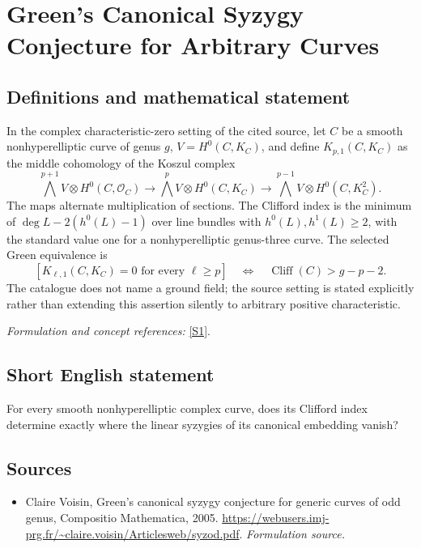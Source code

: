 \documentclass[11pt]{article}
\begin{document}
\section*{\texorpdfstring{Green’s Canonical Syzygy Conjecture for Arbitrary Curves}{Green’s Canonical Syzygy Conjecture for Arbitrary Curves}}\label{30003897}
\subsection{Definitions and mathematical statement}
In the complex characteristic-zero setting of the cited source, let $C$ be a smooth nonhyperelliptic curve of genus $g$, $V=H^0(C,K_C)$, and define $K_{p,1}(C,K_C)$ as the middle cohomology of the Koszul complex
\[
 \bigwedge^{p+1}V\otimes H^0(C,\mathcal O_C)
 \longrightarrow\bigwedge^pV\otimes H^0(C,K_C)
 \longrightarrow\bigwedge^{p-1}V\otimes H^0(C,K_C^2).
\]
The maps alternate multiplication of sections. The Clifford index is the minimum of $\deg L-2(h^0(L)-1)$ over line bundles with $h^0(L),h^1(L)\ge2$, with the standard value one for a nonhyperelliptic genus-three curve. The selected Green equivalence is
\[
 [K_{\ell,1}(C,K_C)=0\text{ for every }\ell\ge p]
 \quad\Longleftrightarrow\quad\operatorname{Cliff}(C)>g-p-2.
\]
The catalogue does not name a ground field; the source setting is stated explicitly rather than extending this assertion silently to arbitrary positive characteristic.
\par\smallskip\textit{Formulation and concept references:} \href{https://webusers.imj-prg.fr/~claire.voisin/Articlesweb/syzod.pdf}{[S1]}.

\subsection{Short English statement}
For every smooth nonhyperelliptic complex curve, does its Clifford index determine exactly where the linear syzygies of its canonical embedding vanish?
\subsection{Sources}
\begin{itemize}
\item[S1]Claire Voisin, Green's canonical syzygy conjecture for generic curves of odd genus, Compositio Mathematica, 2005.
\url{https://webusers.imj-prg.fr/~claire.voisin/Articlesweb/syzod.pdf}.
\textit{Formulation source.}
\end{itemize}
\end{document}
